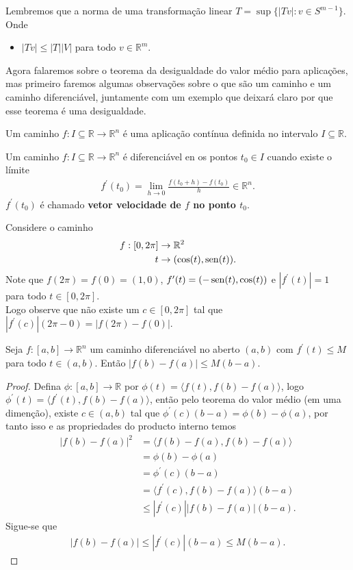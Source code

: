 Lembremos que a norma de uma transformação linear $T=\sup\{|Tv|:v\in S^{m-1}\}$.
Onde
\begin{itemize}
  \item $|Tv|\leq |T||V|$ para todo $v\in\mathbb{R}^{m}$.
\end{itemize}
Agora falaremos sobre o teorema da desigualdade do valor médio para aplicações, mas primeiro faremos algumas observações sobre o que são um caminho e um caminho diferenciável, juntamente com um exemplo que deixará claro por que esse teorema é uma desigualdade.
\begin{definition}[Caminho]
  Um caminho $f:I\subseteq \mathbb{R}\to\mathbb{R}^{n}$ é uma aplicação contínua definida no intervalo $I\subseteq \mathbb{R}$. 
\end{definition}
\begin{definition}
  Um caminho $f:I\subseteq \mathbb{R}\to\mathbb{R}^{n}$ é diferenciável en os pontos $t_0\in I$ cuando existe o límite
  \begin{align*}
    f^{\prime}(t_0)=\lim_{h \to 0}\frac{f(t_0+h)-f(t_0)}{h}\in\mathbb{R}^{n}.
  \end{align*}
  $f^{\prime}(t_0)$ é chamado \textbf{vetor velocidade de $f$ no ponto $t_0$}. 
\end{definition}
\begin{example}
  Considere o caminho
  \begin{align*}
    f:[0,2\pi]&\to\mathbb{R}^{2}\\
    t&\to(\cos(t),\operatorname{sen}(t)).
  \end{align*}
  Note que $f(2\pi)=f(0)=(1,0)$, $f^{\prime}(t)=(-\operatorname{sen}(t),\cos(t))$ e $|f^{\prime}(t)|=1$ para todo $t\in [0,2\pi]$.\\
  Logo observe que não existe um $c\in[0,2\pi]$ tal que $|f^{\prime}(c)|(2\pi-0)=|f(2\pi)-f(0)|$. 
\end{example}
\begin{theorem}
  Seja $f:[a,b]\to\mathbb{R}^{n}$ um caminho diferenciável no aberto $(a,b)$ com $f^{\prime}(t)\leq M$ para todo $t\in(a,b)$. Então $|f(b)-f(a)|\leq M(b-a)$. 
\end{theorem}
\begin{proof} 
  Defina $\phi:[a,b]\to\mathbb{R}$ por $\phi(t)=\langle f(t),f(b)-f(a) \rangle$, logo $\phi^{\prime}(t)=\langle f^{\prime}(t),f(b)-f(a) \rangle$, então pelo teorema do valor médio (em uma dimenção), existe $c\in (a,b)$ tal que $\phi^{\prime}(c)(b-a)=\phi(b)-\phi(a)$, por tanto isso e as propriedades do producto interno temos 
  \begin{align*}
    |f(b)-f(a)|^{2}&=\langle f(b)-f(a),f(b)-f(a) \rangle\\
    &=\phi(b)-\phi(a)\\
    &=\phi^{\prime}(c)(b-a)\\
    &=\langle f^{\prime}(c),f(b)-f(a)\rangle(b-a)\\
    &\leq|f^{\prime}(c)||f(b)-f(a)|(b-a).
  \end{align*}
  Sigue-se que
  \begin{align*}
    |f(b)-f(a)|\leq |f^{\prime}(c)|(b-a)\leq M(b-a).
  \end{align*}
\end{proof}
